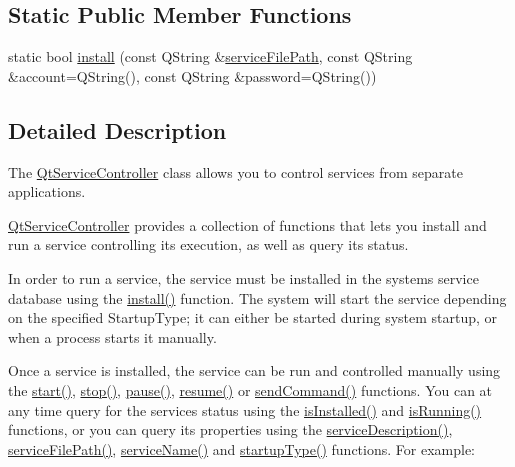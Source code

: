 \subsection*{Static Public Member Functions}
\begin{DoxyCompactItemize}
\item 
static bool \mbox{\hyperlink{class_qt_service_controller_a7e2b85e911ff152557dd25959e76094b}{install}} (const Q\+String \&\mbox{\hyperlink{class_qt_service_controller_a5ab709fdeb3ab526c92ccbbe1b2706c6}{service\+File\+Path}}, const Q\+String \&account=Q\+String(), const Q\+String \&password=Q\+String())
\end{DoxyCompactItemize}


\subsection{Detailed Description}
The \mbox{\hyperlink{class_qt_service_controller}{Qt\+Service\+Controller}} class allows you to control services from separate applications. 

\mbox{\hyperlink{class_qt_service_controller}{Qt\+Service\+Controller}} provides a collection of functions that lets you install and run a service controlling its execution, as well as query its status.

In order to run a service, the service must be installed in the system\textquotesingle{}s service database using the \mbox{\hyperlink{class_qt_service_controller_a7e2b85e911ff152557dd25959e76094b}{install()}} function. The system will start the service depending on the specified Startup\+Type; it can either be started during system startup, or when a process starts it manually.

Once a service is installed, the service can be run and controlled manually using the \mbox{\hyperlink{class_qt_service_controller_a5e9d6da5081d70f31611456d0ef0687e}{start()}}, \mbox{\hyperlink{class_qt_service_controller_ad06afa647666769e309474b18bf7cf90}{stop()}}, \mbox{\hyperlink{class_qt_service_controller_aeee2fcc9469f77c7ed8a7955c4fa3a07}{pause()}}, \mbox{\hyperlink{class_qt_service_controller_a2d71eab6146427fc7b431386bf72eaec}{resume()}} or \mbox{\hyperlink{class_qt_service_controller_a1428c7d51403416bc7663ae37c446cfc}{send\+Command()}} functions. You can at any time query for the service\textquotesingle{}s status using the \mbox{\hyperlink{class_qt_service_controller_a7e36fb18a273118709faf22f732feac4}{is\+Installed()}} and \mbox{\hyperlink{class_qt_service_controller_a4a11b35468848388174a36af66f25fc3}{is\+Running()}} functions, or you can query its properties using the \mbox{\hyperlink{class_qt_service_controller_a503c0fadf098b4c5bbccbb2a57f911e2}{service\+Description()}}, \mbox{\hyperlink{class_qt_service_controller_a5ab709fdeb3ab526c92ccbbe1b2706c6}{service\+File\+Path()}}, \mbox{\hyperlink{class_qt_service_controller_a3df972ecd01a00fff5cda316ae35cbea}{service\+Name()}} and \mbox{\hyperlink{class_qt_service_controller_acfd3b5cb23c17bf415f1d606b8461109}{startup\+Type()}} functions. For example\+:


